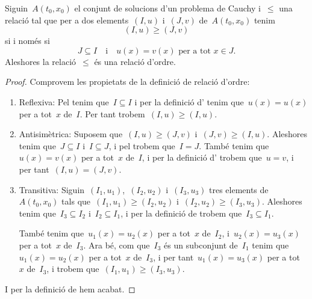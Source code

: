 \documentclass[../../main.tex]{subfiles}
\begin{document}
    \begin{proposition}
        \label{prop:la prolongació és una relació d'ordre}
        Siguin~\(A(t_{0},x_{0})\) el conjunt de solucions d'un problema de Cauchy i~\(\leq\) una relació tal que per a dos elements~\((I,u)\) i~\((J,v)\) de~\(A(t_{0},x_{0})\) tenim
        \[
            (I,u)\geq(J,v)
        \]
        si i només si
        \[
            J\subseteq I\quad\text{i}\quad u(x)=v(x)\text{ per a tot }x\in J.
        \]
        Aleshores la relació~\(\leq\) és una relació d'ordre.
        \begin{proof}
            Comprovem les propietats de la definició de relació d'ordre:
            \begin{enumerate}
                \item Reflexiva: Pel  tenim que~\(I\subseteq I\) i per la definició d' tenim que~\(u(x)=u(x)\) per a tot~\(x\) de~\(I\).
                Per tant trobem~\((I,u)\geq(I,u)\).

                \item Antisimètrica: Suposem que~\((I,u)\geq(J,v)\) i~\((J,v)\geq(I,u)\).
                Aleshores tenim que~\(J\subseteq I\) i~\(I\subseteq J\), i pel  trobem que~\(I=J\).
                També tenim que~\(u(x)=v(x)\) per a tot~\(x\) de~\(I\), i per la definició d' trobem que~\(u=v\), i per tant~\((I,u)=(J,v)\).

                \item Transitiva: Siguin~\((I_{1},u_{1})\),~\((I_{2},u_{2})\) i~\((I_{3},u_{3})\) tres elements de~\(A(t_{0},x_{0})\) tals que~\((I_{1},u_{1})\geq(I_{2},u_{2})\) i~\((I_{2},u_{2})\geq(I_{3},u_{3})\).
                Aleshores tenim que~\(I_{3}\subseteq I_{2}\) i~\(I_{2}\subseteq I_{1}\), i per la definició de  trobem que~\(I_{3}\subseteq I_{1}\).

                També tenim que~\(u_{1}(x)=u_{2}(x)\) per a tot~\(x\) de~\(I_{2}\), i~\(u_{2}(x)=u_{3}(x)\) per a tot~\(x\) de~\(I_{3}\).
                Ara bé, com que~\(I_{3}\) és un subconjunt de~\(I_{1}\) tenim que~\(u_{1}(x)=u_{2}(x)\) per a tot~\(x\) de~\(I_{3}\), i per tant~\(u_{1}(x)=u_{3}(x)\) per a tot~\(x\) de~\(I_{3}\), i trobem que~\((I_{1},u_{1})\geq(I_{3},u_{3})\).
            \end{enumerate}
            I per la definició de  hem acabat.
        \end{proof}
    \end{proposition}
\end{document}
